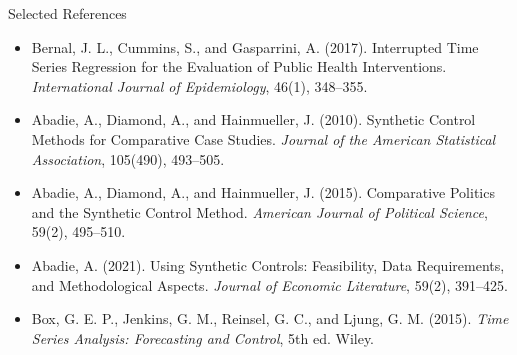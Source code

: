 \documentclass[aspectratio=169,11pt]{beamer}
\begin{document}
\begin{frame}{Selected References}
\small
\begin{itemize}
\item Bernal, J. L., Cummins, S., and Gasparrini, A. (2017). Interrupted Time Series Regression for the Evaluation of Public Health Interventions. \textit{International Journal of Epidemiology}, 46(1), 348--355.
\item Abadie, A., Diamond, A., and Hainmueller, J. (2010). Synthetic Control Methods for Comparative Case Studies. \textit{Journal of the American Statistical Association}, 105(490), 493--505.
\item Abadie, A., Diamond, A., and Hainmueller, J. (2015). Comparative Politics and the Synthetic Control Method. \textit{American Journal of Political Science}, 59(2), 495--510.
\item Abadie, A. (2021). Using Synthetic Controls: Feasibility, Data Requirements, and Methodological Aspects. \textit{Journal of Economic Literature}, 59(2), 391--425.
\item Box, G. E. P., Jenkins, G. M., Reinsel, G. C., and Ljung, G. M. (2015). \textit{Time Series Analysis: Forecasting and Control}, 5th ed. Wiley.
\end{itemize}
\end{frame}

\contactslide
\end{document}
